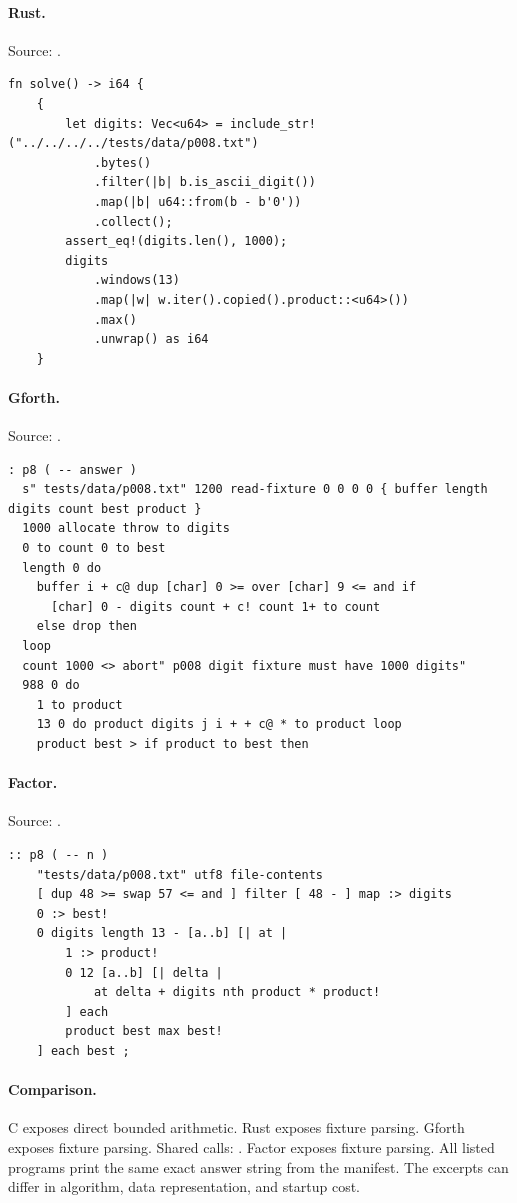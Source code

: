 \paragraph{Rust.} Source: .
\begin{lstlisting}
fn solve() -> i64 {
    {
        let digits: Vec<u64> = include_str!("../../../../tests/data/p008.txt")
            .bytes()
            .filter(|b| b.is_ascii_digit())
            .map(|b| u64::from(b - b'0'))
            .collect();
        assert_eq!(digits.len(), 1000);
        digits
            .windows(13)
            .map(|w| w.iter().copied().product::<u64>())
            .max()
            .unwrap() as i64
    }
\end{lstlisting}

\paragraph{Gforth.} Source: .
\begin{lstlisting}
: p8 ( -- answer )
  s" tests/data/p008.txt" 1200 read-fixture 0 0 0 0 { buffer length digits count best product }
  1000 allocate throw to digits
  0 to count 0 to best
  length 0 do
    buffer i + c@ dup [char] 0 >= over [char] 9 <= and if
      [char] 0 - digits count + c! count 1+ to count
    else drop then
  loop
  count 1000 <> abort" p008 digit fixture must have 1000 digits"
  988 0 do
    1 to product
    13 0 do product digits j i + + c@ * to product loop
    product best > if product to best then
\end{lstlisting}

\paragraph{Factor.} Source: .
\begin{lstlisting}
:: p8 ( -- n )
    "tests/data/p008.txt" utf8 file-contents
    [ dup 48 >= swap 57 <= and ] filter [ 48 - ] map :> digits
    0 :> best!
    0 digits length 13 - [a..b] [| at |
        1 :> product!
        0 12 [a..b] [| delta |
            at delta + digits nth product * product!
        ] each
        product best max best!
    ] each best ;
\end{lstlisting}

\paragraph{Comparison.}
C exposes direct bounded arithmetic. Rust exposes fixture parsing. Gforth exposes fixture parsing. Shared calls: \texttt{}. Factor exposes fixture parsing.
All listed programs print the same exact answer string from the manifest. The excerpts can differ in algorithm, data representation, and startup cost.

